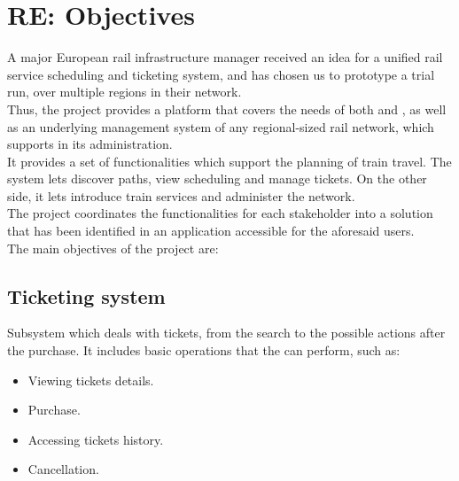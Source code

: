 \section*{RE: Objectives}

A major European rail infrastructure manager received an idea for a unified rail service scheduling and ticketing system, and has chosen us to prototype a trial run, over multiple regions in their network.\\

Thus, the project provides a platform that covers the needs of both  and , as well as an underlying 
management system of any regional-sized rail network, which supports  in its administration. \\
It provides a set of functionalities which support the planning of train travel. The system lets  discover paths, view scheduling and manage tickets. On the other side, it lets  introduce train services and  administer the network.\\
The project coordinates the functionalities for each stakeholder into a solution that has been identified in an application accessible for the aforesaid users. \\

\noindent The main objectives of the project are:

\subsection*{Ticketing system}
Subsystem which deals with tickets, from the search to the possible actions after the purchase. 
It includes basic operations that the  can perform, such as:
\begin{itemize}
	\item Viewing tickets details.
	\item Purchase.
	\item Accessing tickets history.
	\item Cancellation.
\end{itemize}


